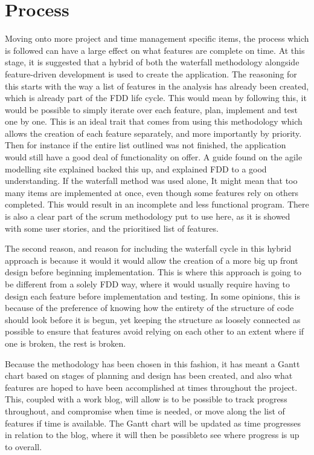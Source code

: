 \section{Process}
Moving onto more project and time management specific items, the process which is followed can have a large effect on what features are complete on time. At this stage, it is suggested that a hybrid of both the waterfall methodology alongside feature-driven development is used to create the application. The reasoning for this starts with the way a list of features in the analysis has already been created, which is already part of the FDD life cycle. This would mean by following this, it  would be possible to simply iterate over each feature, plan, implement and test one by one. This is an ideal trait that comes from using this methodology which allows the creation of each feature separately, and more importantly by priority. Then for instance if the entire list outlined was not finished, the application would still have a good deal of functionality on offer. A guide found on the agile modelling site\cite{FDD} explained backed this up, and explained FDD to a good understanding. If the waterfall method was used alone, It might mean that too many items are implemented at once, even though some features rely on others completed. This would result in an incomplete and less functional program. There is also a clear part of the scrum methodology put to use here, as it is showed with some user stories, and the prioritised list of features.

The second reason, and reason for including the waterfall cycle in this hybrid approach is because it would it would allow the creation of a more big up front design before beginning implementation. This is where this approach is going to be different from a solely FDD way, where it would usually require having to design each feature before implementation and testing. In some opinions, this is because of the preference of knowing how the entirety of the structure of code should look before it is begun, yet keeping the structure as loosely connected as possible to ensure that features avoid relying on each other to an extent where if one is broken, the rest is broken. 

Because the methodology has been chosen in this fashion, it has meant a Gantt chart based on stages of planning and design has been created, and also what features are hoped to have been accomplished at times throughout the project. This, coupled with a work blog, will allow is to be possible to track progress throughout, and compromise when time is needed, or move along the list of features if time is available. The Gantt chart will be updated as time progresses in relation to the blog, where it will then be possibleto see where progress is up to overall.

